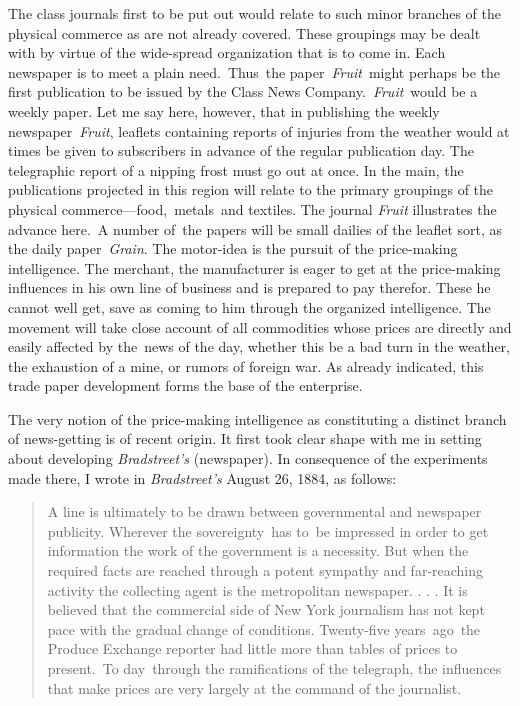 \documentclass[openany,nobib]{tufte-book}
\begin{document}
The class journals first to be put out would relate to such minor
branches of the physical commerce as are not already covered. These
groupings may be dealt with by virtue of the wide-spread organization
that is to come in. Each newspaper is to meet a plain need.~Thus~the
paper~\emph{Fruit}~might perhaps be the first publication to be issued
by the Class News Company.~\emph{Fruit}~would be a weekly paper. Let me
say here, however, that in publishing the weekly newspaper~\emph{Fruit},
leaflets containing reports of injuries from the weather would at times
be given to subscribers in advance of the regular publication day. The
telegraphic report of a nipping frost must go out at once. In the main,
the publications projected in this region will relate to the primary
groupings of the physical commerce---food,~metals~and textiles. The
journal \emph{Fruit} illustrates the advance here.~A number of~the
papers will be small dailies of the leaflet sort, as the daily
paper~\emph{Grain}. The motor-idea is the pursuit of the price-making
intelligence. The merchant, the manufacturer is eager to get at the
price-making influences in his own line of business and is prepared to
pay therefor. These he cannot well get, save as coming to him through
the organized intelligence. The movement will take close account of all
commodities whose prices are directly and easily affected by the~news of
the day, whether this be a bad turn in the weather, the exhaustion of a
mine, or rumors of foreign war. As already indicated, this trade paper
development forms the base of the enterprise.~

The very notion of the price-making intelligence as constituting a
distinct branch of news-getting is of recent origin. It first took clear
shape with me in setting about developing \emph{Bradstreet's}
(newspaper). In consequence of the experiments made there, I wrote in
\emph{Bradstreet's} August 26, 1884, as follows:

\begin{quote}
A line is ultimately to be drawn between governmental and newspaper
publicity. Wherever the sovereignty~has to~be impressed in order to get
information the work of the government is a necessity. But when the
required facts are reached through a potent sympathy and far-reaching
activity the collecting agent is the metropolitan newspaper. . . . It is
believed that the commercial side of New York journalism has not kept
pace with the gradual change of conditions. Twenty-five years~ago~the
Produce Exchange reporter had little more than tables of prices to
present.~To day~through the ramifications of the telegraph, the
influences that make prices are very largely at the command of the
journalist.~
\end{quote}
\end{document}
